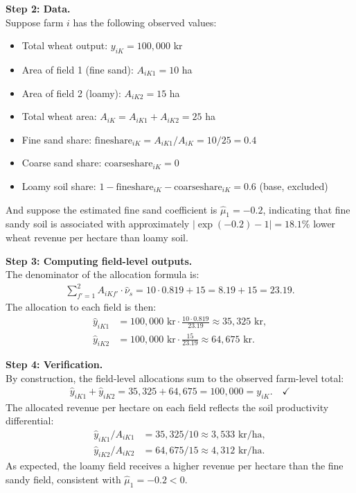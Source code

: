 \documentclass[12pt]{article}
\begin{document}
\begin{tcolorbox}[
  colback=gray!10,
  colframe=gray!50!black,
  title=Example: Estimating Field-Level Outputs,
  fonttitle=\bfseries,
  arc=2mm,
  breakable
]
\medskip
\noindent\textbf{Step 2: Data.}\\
Suppose farm $i$ has the following observed values:
\begin{itemize}
    \item Total wheat output: $y_{iK} = 100{,}000$ kr
    \item Area of field 1 (fine sand): $A_{iK1} = 10$ ha
    \item Area of field 2 (loamy): $A_{iK2} = 15$ ha
    \item Total wheat area: $A_{iK} = A_{iK1} + A_{iK2} = 25$ ha
    \item Fine sand share: $\text{fineshare}_{iK} = A_{iK1} / A_{iK} = 10/25 = 0.4$
    \item Coarse sand share: $\text{coarseshare}_{iK} = 0$
    \item Loamy soil share: $1 - \text{fineshare}_{iK} - \text{coarseshare}_{iK} = 0.6$
    (base, excluded)
\end{itemize}
And suppose the estimated fine sand coefficient is $\hat{\mu}_1 = -0.2$,
indicating that fine sandy soil is associated with approximately $|\exp{(-0.2)} - 1| = 18.1\%$ lower
wheat revenue per hectare than loamy soil.

\medskip
\noindent\textbf{Step 3: Computing field-level outputs.}\\
The denominator of the allocation formula is:
\begin{align*}
    \sum_{f'=1}^{2} A_{iKf'} \cdot \hat{\nu}_{s}
    = 10 \cdot 0.819 + 15 = 8.19 + 15 = 23.19.
\end{align*}
The allocation to each field is then:
\begin{align*}
    \hat{y}_{iK1} & = 100{,}000 \text{ kr} \cdot \frac{10 \cdot 0.819}{23.19}
    \approx 35{,}325 \text{ kr}, \\[0.5em]
    \hat{y}_{iK2} & = 100{,}000 \text{ kr} \cdot \frac{15}{23.19}
    \approx 64{,}675 \text{ kr}.
\end{align*}

\medskip
\noindent\textbf{Step 4: Verification.}\\
By construction, the field-level allocations sum to the observed farm-level total:
\begin{align*}
    \hat{y}_{iK1} + \hat{y}_{iK2} = 35{,}325 + 64{,}675 = 100{,}000 = y_{iK}.
    \quad \checkmark
\end{align*}
The allocated revenue per hectare on each field reflects the soil productivity
differential:
\begin{align*}
    \hat{y}_{iK1} / A_{iK1} & = 35{,}325 / 10 \approx 3{,}533 \text{ kr/ha}, \\
    \hat{y}_{iK2} / A_{iK2} & = 64{,}675 / 15 \approx 4{,}312 \text{ kr/ha}.
\end{align*}
As expected, the loamy field receives a higher revenue per hectare than the fine
sandy field, consistent with $\hat{\mu}_1 = -0.2 < 0$.
\end{tcolorbox}
\end{document}
